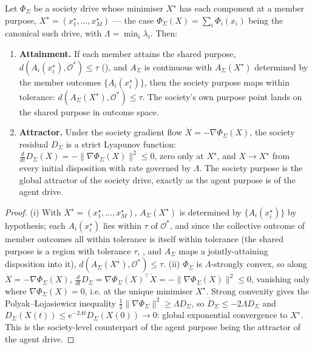 \documentclass[11pt,twocolumn,a4paper]{article}
\newcommand{\drive}{\Phi}            %
\newcommand{\lam}{\lambda}
\newcommand{\Purp}{x^{\star}}        %
\newcommand{\Soc}{\Sigma}            %
\newcommand{\Out}{\mathcal{O}}       %
\newcommand{\tol}{\tau}
\newcommand{\norm}[1]{\lVert#1\rVert}
\newcommand{\dist}{d}
\begin{document}
\begin{proposition}
\label{prop:society-purpose}
Let $\drive_\Soc$ be a society drive whose minimiser $X^\star$ has each
component at a member purpose, $X^\star=(\Purp_1,\dots,\Purp_M)$ --- the case
$\drive_\Soc(X)=\sum_i\drive_i(x_i)$ being the canonical such drive, with
$\Lambda=\min_i\lam_i$. Then:
\begin{enumerate}[label=\textup{(\roman*)},leftmargin=2.2em]
\item \textbf{Attainment.} If each member attains the shared purpose,
$\dist(A_i(\Purp_i),\Out^\ast)\le\tol$ (), and $A_\Soc$ is
continuous with $A_\Soc(X^\star)$ determined by the member outcomes
$\{A_i(\Purp_i)\}$, then the society purpose maps within tolerance:
$\dist(A_\Soc(X^\star),\Out^\ast)\le\tol$. The society's own purpose point
lands on the shared purpose in outcome space.
\item \textbf{Attractor.} Under the society gradient flow
$\dot X=-\nabla\drive_\Soc(X)$, the society residual $D_\Soc$ is a strict
Lyapunov function: $\frac{d}{dt}D_\Soc(X)=-\norm{\nabla\drive_\Soc(X)}^2\le0$,
zero only at $X^\star$, and $X\to X^\star$ from every initial disposition
with rate governed by $\Lambda$. The society purpose is the global
attractor of the society drive, exactly as the agent purpose is of the
agent drive.
\end{enumerate}
\end{proposition}

\begin{proof}
(i) With $X^\star=(\Purp_1,\dots,\Purp_M)$, $A_\Soc(X^\star)$ is determined
by $\{A_i(\Purp_i)\}$ by hypothesis; each $A_i(\Purp_i)$ lies within $\tol$
of $\Out^\ast$, and since the collective outcome of member outcomes all
within tolerance is itself within tolerance (the shared purpose is a region
with tolerance $\tol$, , and $A_\Soc$ maps a
jointly-attaining disposition into it), $\dist(A_\Soc(X^\star),\Out^\ast)\le
\tol$. (ii) $\drive_\Soc$ is $\Lambda$-strongly convex, so along
$\dot X=-\nabla\drive_\Soc(X)$,
$\frac{d}{dt}D_\Soc=\nabla\drive_\Soc(X)^\top\dot X=
-\norm{\nabla\drive_\Soc(X)}^2\le0$, vanishing only where
$\nabla\drive_\Soc(X)=0$, i.e. at the unique minimiser $X^\star$. Strong
convexity gives the Polyak--\L{}ojasiewicz inequality
$\tfrac12\norm{\nabla\drive_\Soc}^2\ge\Lambda D_\Soc$, so
$\dot D_\Soc\le-2\Lambda D_\Soc$ and $D_\Soc(X(t))\le e^{-2\Lambda
t}D_\Soc(X(0))\to0$: global exponential convergence to $X^\star$. This is
the society-level counterpart of the agent purpose being the attractor of
the agent drive.
\end{proof}
\end{document}
